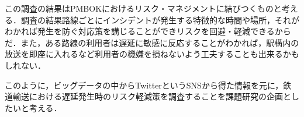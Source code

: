 \documentclass[uplatex,twocolumn,dvipdfmx]{jsarticle}
\begin{document}
この調査の結果はPMBOKにおけるリスク・マネジメントに結びつくものと考える．調査の結果路線ごとにインシデントが発生する特徴的な時間や場所，それがわかれば発生を防ぐ対応策を講じることができリスクを回避・軽減できるからだ．また，ある路線の利用者は遅延に敏感に反応することがわかれば，駅構内の放送を即座に入れるなど利用者の機嫌を損ねないよう工夫することも出来るかもしれない．

このように，ビッグデータの中からTwitterというSNSから得た情報を元に，鉄道輸送における遅延発生時のリスク軽減策を調査することを課題研究の企画としたいと考える．



\end{document}
